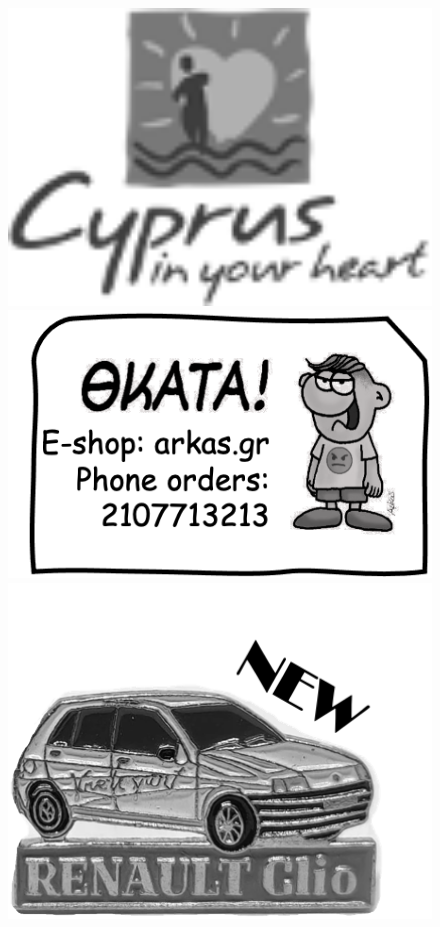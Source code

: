 \begin{MyAd}[enhanced, tikz={rotate=0},  width=0.10\textwidth]{}%
  \begin{figure}
    \begin{center}
      \vspace{-0.5cm}
      \includegraphics[width=1.0\textwidth]{./figures/cyprus.png}
      \bigbreak
      \includegraphics[width=1.0\textwidth]{./figures/thkata.png}
      \bigbreak
      \includegraphics[width=1.0\textwidth]{./figures/car.png}

\end{center}
\end{figure}
\end{MyAd}
